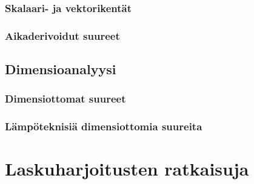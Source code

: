 \documentclass[12pt,a4paper,finnish]{book}
\begin{document}
\section{Skalaari- ja vektorikentät}

\section{Aikaderivoidut suureet}

\chapter{Dimensioanalyysi} %

\section{Dimensiottomat suureet}

\section{Lämpöteknisiä dimensiottomia suureita}

\part{Laskuharjoitusten ratkaisuja} %
\end{document}
